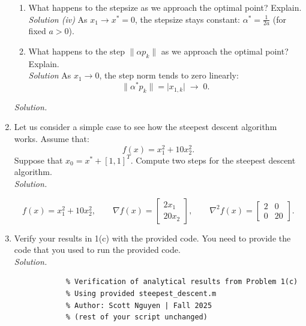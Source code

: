 \documentclass[11pt]{article}
\begin{document}
\begin{enumerate}[label=\textbf{1(\alph*)}]
\begin{enumerate}[label=\roman*.]
			\item What happens to the stepsize as we approach the optimal point? Explain.\\
			\textit{Solution (iv)} As $x_1\to x^\ast=0$, the stepsize stays constant: $\alpha^\ast=\tfrac{1}{2a}$ (for fixed $a>0$).\\
			
			\item What happens to the step $\| \alpha p_k \|$ as we approach the optimal point? Explain.\\
			\textit{Solution} As $x_1\to 0$, the step norm tends to zero linearly:
			\[
			\|\alpha^\ast p_k\|=\lvert x_{1,k}\rvert \;\longrightarrow\; 0.
			\]
		\end{enumerate}
		\textit{Solution.}
		
		\item Let us consider a simple case to see how the steepest descent algorithm works. Assume that:
		\[
		f(x) = x_1^2 + 10 x_2^2.
		\]
		Suppose that $x_0 = x^{\ast} + [1, 1]^T$. Compute two steps for the steepest descent algorithm.\\[0.25em]
		\textit{Solution.}
		
		\[
		f(x)=x_1^2+10x_2^2,\qquad 
		\nabla f(x)=\begin{bmatrix}2x_1\\[2pt]20x_2\end{bmatrix},\qquad
		\nabla^2 f(x)=\begin{bmatrix}2&0\\[2pt]0&20\end{bmatrix}.
		\]
		
		\item Verify your results in 1(c) with the provided code. You need to provide
		the code that you used to run the provided code.\\[0.25em]
		\textit{Solution.}
		
		\begin{lstlisting}[style=matlabstyle,caption={Verification code for Problem 1(e)},label={lst:1e}]
			%% ECE 506 - HW4 Problem 1(e)
			% Verification of analytical results from Problem 1(c)
			% Using provided steepest_descent.m
			% Author: Scott Nguyen | Fall 2025
			% (rest of your script unchanged)
		\end{lstlisting}
		

\end{enumerate}
\end{document}
